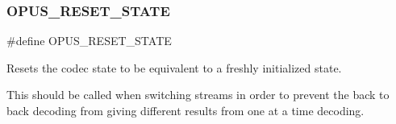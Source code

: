 \subsubsection{\texorpdfstring{O\+P\+U\+S\+\_\+\+R\+E\+S\+E\+T\+\_\+\+S\+T\+A\+TE}{OPUS\_RESET\_STATE}}
{\footnotesize\ttfamily \#define O\+P\+U\+S\+\_\+\+R\+E\+S\+E\+T\+\_\+\+S\+T\+A\+TE}



Resets the codec state to be equivalent to a freshly initialized state. 

This should be called when switching streams in order to prevent the back to back decoding from giving different results from one at a time decoding. 